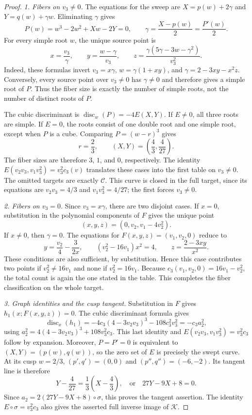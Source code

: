 \documentclass[11pt]{article}
\numberwithin{equation}{section}
\theoremstyle{plain}
\theoremstyle{definition}
\theoremstyle{remark}
\begin{document}
\begin{proof}
\emph{1. Fibers on $v_3\ne0$.}
The equations for the sweep are
$X=p(w)+2\gamma$ and $Y=q(w)+\gamma w$. Eliminating $\gamma$ gives
\[
 P(w)=w^3-2w^2+Xw-2Y=0,\qquad
 \gamma=\frac{X-p(w)}2=\frac{P'(w)}2.
\]
For every simple root $w$, the unique source point is
\begin{equation}\label{eq:app-F-inverse}
 x=\frac{v_3}\gamma,\qquad y=\frac{w-\gamma}{v_3},\qquad
 z=\frac{\gamma(5\gamma-3w-\gamma^2)}{v_3^2}.
\end{equation}
Indeed, these formulas invert
$v_3=x\gamma$, $w=\gamma(1+xy)$, and $\gamma=2-3xy-x^2z$.
Conversely, every source point over $v_3\ne0$ has $\gamma\ne0$ and
therefore gives a simple root of $P$. Thus the fiber size is exactly
the number of simple roots, not the number of distinct roots of $P$.

The cubic discriminant is $\operatorname{disc}_w(P)=-4E(X,Y)$.
If $E\ne0$, all three roots are simple. If $E=0$, the roots consist of
one double root and one simple root, except when $P$ is a cube.
Comparing $P=(w-r)^3$ gives
\[
 r=\frac23,\qquad (X,Y)=\left(\frac43,\frac4{27}\right).
\]
The fiber sizes are therefore $3$, $1$, and $0$, respectively.
The identity $E(v_2v_3,v_1v_3^2)=v_3^2c_3(v)$ translates these cases into the
first table on $v_3\ne0$. The omitted targets are exactly $\mathcal C$.
This curve is closed in the full target, since its equations are
$v_2v_3=4/3$ and $v_1v_3^2=4/27$; the first forces $v_3\ne0$.

\emph{2. Fibers on $v_3=0$.}
Since $v_3=x\gamma$, there are two disjoint cases. If $x=0$, substitution
in the polynomial components of $F$ gives the unique point
\[
 (x,y,z)=(0,v_2,v_1-4v_2^2).
\]
If $x\ne0$, then $\gamma=0$. The equations for $F(x,y,z)=(v_1,v_2,0)$
reduce to
\[
 y=\frac{v_2}4-\frac3{2x},\qquad
 (v_2^2-16v_1)x^2=4,\qquad z=\frac{2-3xy}{x^2}.
\]
These conditions are also sufficient, by substitution. Hence this case
contributes two points if $v_2^2\ne16v_1$ and none if $v_2^2=16v_1$.
Because $c_3(v_1,v_2,0)=16v_1-v_2^2$, the total count is again the one stated
in the table. This completes the fiber classification on the whole target.

\emph{3. Graph identities and the cusp tangent.}
Substitution in $F$ gives $h_1(x;F(x,y,z))=0$. The cubic discriminant
formula gives
\[
 \operatorname{disc}_x(h_1)
 =-4c_3(4-3v_2v_3)^3-108c_3^2v_3^2=-c_3a_2^2,
\]
using $a_2^2=4(4-3v_2v_3)^3+108v_3^2c_3$. This last identity and
$E(v_2v_3,v_1v_3^2)=v_3^2c_3$ follow by expansion.
Moreover, $P=P'=0$ is equivalent to $(X,Y)=(p(w),q(w))$, so the
zero set of $E$ is precisely the swept curve. At its cusp $w=2/3$,
$(p',q')=(0,0)$ and $(p'',q'')=(-6,-2)$. Its tangent line is therefore
\[
 Y-\frac4{27}=\frac13\left(X-\frac43\right),
 \quad\text{or}\quad 27Y-9X+8=0.
\]
Since $a_2=2(27Y-9X+8)\circ\sigma$, this proves the tangent assertion.
The identity $E\circ\sigma=v_3^2c_3$ also gives the asserted full inverse
image of $\mathcal K$.


\end{proof}
\end{document}
